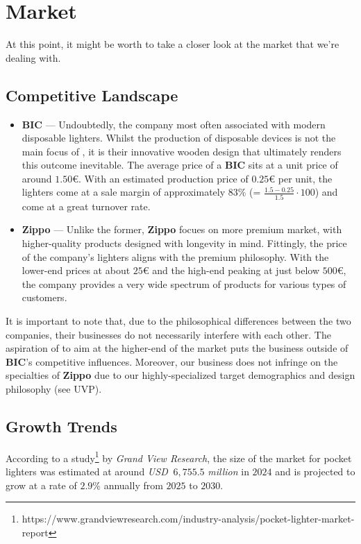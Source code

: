 \section{Market}
At this point, it might be worth to take a closer look at the market that we're dealing with.
\subsection{Competitive Landscape}
\begin{itemize}
	\item \textbf{BIC} --- Undoubtedly, the company most often associated with modern disposable lighters.
		Whilst the production of disposable devices is not the main focus of {\fw}, it is their innovative
		wooden design that ultimately renders this outcome inevitable. The average price of a \textbf{BIC} sits
		at a unit price of around $1.50$\euro. With an estimated production price of $0.25${\euro} per unit,
		the lighters come at a sale margin of approximately $83\%$ (= $\frac{1.5 - 0.25}{1.5} \cdot 100$) and
		come at a great turnover rate.
	\item \textbf{Zippo} --- Unlike the former, \textbf{Zippo} focues on more premium market, with higher-quality
		products designed with longevity in mind. Fittingly, the price of the company's lighters aligns with the
		premium philosophy. With the lower-end prices at about $25${\euro} and the high-end peaking
		at just below $500${\euro}, the company provides a very wide spectrum of products for various types of
		customers.
\end{itemize}
It is important to note that, due to the philosophical differences between the two companies, their businesses do not
necessarily interfere with each other. The aspiration of {\fw} to aim at the higher-end of the market puts the business
outside of \textbf{BIC}'s competitive influences. Moreover, our business does not infringe on the specialties of \textbf{Zippo}
due to our highly-specialized target demographics and design philosophy (see UVP).
\subsection{Growth Trends}
According to a study\footnote{https://www.grandviewresearch.com/industry-analysis/pocket-lighter-market-report}
by \textit{Grand View Research}, the size of the market for pocket lighters was estimated at
around \textit{USD} $\:6,755.5$ \textit{million} in $2024$ and is projected to grow at a rate of $2.9\%$ annually from
$2025$ to $2030$.
